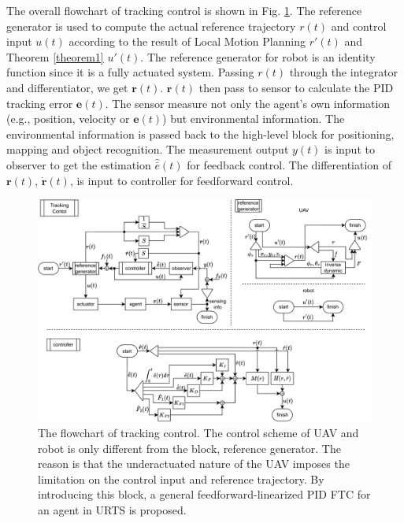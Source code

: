 \documentclass{ieeeaccess}
\begin{document}
The overall flowchart of tracking control is shown in Fig. \ref{fig:tracking}. The reference generator is used to compute the actual reference trajectory $r(t)$ and control input $u(t)$ according to the result of Local Motion Planning $r'(t)$ and Theorem \ref{theorem1} $u'(t)$. The reference generator for robot is an identity function since it is a fully actuated system. Passing $r(t)$ through the integrator and differentiator, we get $\pmb{r}(t)$. $\pmb{r}(t)$ then pass to sensor to calculate the PID tracking error $\pmb{e}(t)$. The sensor measure not only the agent's own information (e.g., position, velocity or $\pmb{e}(t)$) but environmental information. The environmental information is passed back to the high-level block for positioning, mapping and object recognition. The measurement output $y(t)$ is input to observer to get the estimation $\hat{\bar{e}}(t)$ for feedback control. The differentiation of $\pmb{r}(t)$, $\pmb{\dot{r}}(t)$, is input to controller for feedforward control.

\begin{figure}[htbp]
    \centering
    \includegraphics[scale=.42]{fig/tracking.pdf}\caption{The flowchart of tracking control. The control scheme of UAV and robot is only different from the block, reference generator. The reason is that the underactuated nature of the UAV imposes the limitation on the control input and reference trajectory. By introducing this block, a general feedforward-linearized PID FTC for an agent in URTS is proposed.}%
    \label{fig:tracking}
\end{figure}
\end{document}
